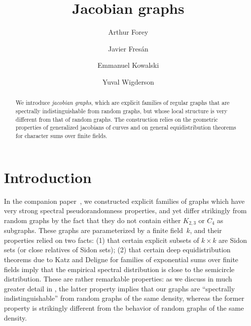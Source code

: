 \documentclass[12pt]{amsart}
\numberwithin{equation}{section}
\theoremstyle{plain}
\theoremstyle{remark}
\theoremstyle{definition}
\begin{document}
\title{Jacobian graphs}

\author{Arthur Forey}
\address[A. Forey]{Univ. Lille, CNRS, UMR 8524 - Laboratoire Paul Painlevé,  \newline F-59000 Lille, France} 

\author{Javier Fresán}
\address[J. Fres\'an]{Sorbonne Université and Université Paris Cité, CNRS, IMJ-PRG, \newline F-75005 Paris, France}

\author{Emmanuel Kowalski}
\address[E. Kowalski]{D-MATH, ETH Zürich, Rämistrasse 101, 8092 Zürich, Switzerland} 

\author{Yuval Wigderson}
\address[Y. Wigderson]{ETH-ITS, Scheuchzerstrasse 70, 8006 Zürich, Switzerland} 

\begin{abstract}
  We introduce \emph{jacobian graphs}, which are explicit
  families of regular graphs that are spectrally indistinguishable from
  random graphs, but whose local structure is very different from that
  of random graphs. The construction relies on the geometric properties
  of generalized jacobians of curves and on general equidistribution
  theorems for character sums over finite fields.
\end{abstract}




\maketitle 

\setcounter{tocdepth}{1}
\tableofcontents

\section{Introduction}

In the companion paper~\cite{short}, we constructed explicit families of
graphs which have very strong spectral pseudorandomness properties, and
yet differ strikingly from random graphs by the fact that they do not contain
either $K_{2,3}$ or $C_4$ as subgraphs. These graphs are parameterized by a finite field~$k$, and their properties relied on two facts: (1) that
certain explicit subsets of $k\times k$ are Sidon sets (or close relatives
of Sidon sets); (2) that certain deep equidistribution theorems due to
Katz and Deligne for families of exponential sums over finite fields
imply that the empirical spectral distribution is close to the
semicircle distribution. These are rather remarkable properties: as we discuss in much greater detail in \cite{short}, the latter property implies that our graphs are ``spectrally indistinguishable'' from random graphs of the same density, whereas the former property is strikingly different from the behavior of random graphs of the same density. 
\end{document}
